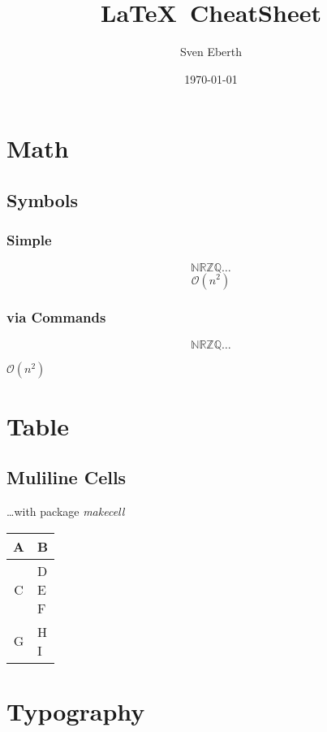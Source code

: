 \documentclass[11pt]{article}
\title{\LaTeX~CheatSheet}
\author{Sven Eberth}
\date{\today}
\begin{document}
    \maketitle
    \tableofcontents
    \newpage


    \section{Math}\label{sec:math}
		\subsection{Symbols}
			\subsubsection{Simple}
		    \[ \mathbb{N R Z Q} \ldots \]
		    \[ \mathcal{O}(n^2) \]
		
		    \subsubsection{via Commands}
		    \newcommand{\N}[0]{\mathbb{N}}
		    \newcommand{\R}[0]{\mathbb{R}}
		    \newcommand{\Z}[0]{\mathbb{Z}}
		    \newcommand{\Q}[0]{\mathbb{Q}}
		    
		    \newcommand{\bigO}[1]{$\mathcal{O}(#1)$}
		
		    \[ \N \R \Z \Q \ldots \]
		    \begin{center}
			    	\bigO{n^2}
			\end{center}


    \section{Table}\label{sec:table}
		\subsection{Muliline Cells}
		\ldots with package \textit{makecell}
		
		\begin{tabular}{cl}
			A		& B  \\
			\hline
			C		& \makecell[tl]{D \\ E \\ F} \\
			\hline
			G		& \makecell[tr]{H \\ I}
	    \end{tabular}
	    
	\newpage
	\section{Typography}\label{sec:typo}
\end{document}
